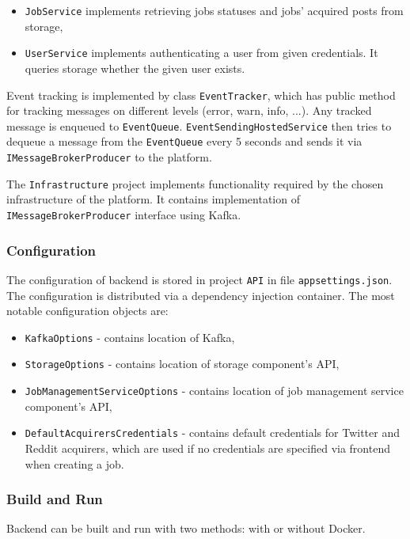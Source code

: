 \begin{itemize}
    \item \texttt{JobService} implements retrieving jobs statuses and jobs' acquired posts from storage,
    
    \item \texttt{UserService} implements authenticating a user from given credentials. It queries storage whether the given user exists.
\end{itemize}

Event tracking is implemented by class \texttt{EventTracker}, which has public method for tracking messages on different levels (error, warn, info, ...). Any tracked message is enqueued to \texttt{EventQueue}. \texttt{EventSendingHostedService} then tries to dequeue a message from the \texttt{EventQueue} every 5 seconds and sends it via \texttt{IMessageBrokerProducer} to the platform.

The \texttt{Infrastructure} project implements functionality required by the chosen infrastructure of the platform. It contains implementation of \texttt{IMessageBro\-kerProducer} interface using Kafka.

\subsubsection{Configuration}
The configuration of backend is stored in project \texttt{API} in file \texttt{appsettings.json}. The configuration is distributed via a dependency injection  container. The most notable configuration objects are:
\begin{itemize}
    \item \texttt{KafkaOptions} - contains location of Kafka,
    \item \texttt{StorageOptions} - contains location of storage component's API,
    \item \texttt{JobManagementServiceOptions} - contains location of job management service component's API,
    \item \texttt{DefaultAcquirersCredentials} - contains default credentials for Twitter and Reddit acquirers, which are used if no credentials are specified via frontend when creating a job.
\end{itemize}

\subsubsection{Build and Run}
Backend can be built and run with two methods: with or without Docker.

